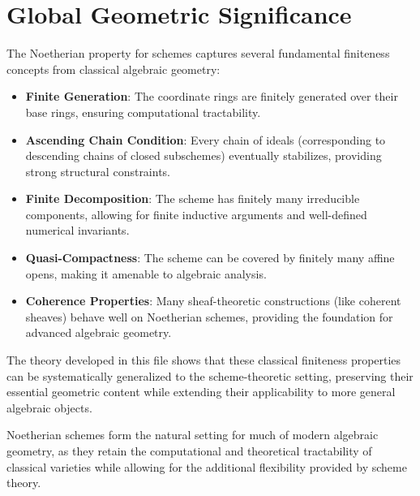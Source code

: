 \documentclass{article}
\theoremstyle{definition}
\begin{document}
\section{Global Geometric Significance}

The Noetherian property for schemes captures several fundamental finiteness concepts from classical algebraic geometry:

\begin{itemize}
\item \textbf{Finite Generation}: The coordinate rings are finitely generated over their base rings, ensuring computational tractability.

\item \textbf{Ascending Chain Condition}: Every chain of ideals (corresponding to descending chains of closed subschemes) eventually stabilizes, providing strong structural constraints.

\item \textbf{Finite Decomposition}: The scheme has finitely many irreducible components, allowing for finite inductive arguments and well-defined numerical invariants.

\item \textbf{Quasi-Compactness}: The scheme can be covered by finitely many affine opens, making it amenable to algebraic analysis.

\item \textbf{Coherence Properties}: Many sheaf-theoretic constructions (like coherent sheaves) behave well on Noetherian schemes, providing the foundation for advanced algebraic geometry.
\end{itemize}

The theory developed in this file shows that these classical finiteness properties can be systematically generalized to the scheme-theoretic setting, preserving their essential geometric content while extending their applicability to more general algebraic objects.

Noetherian schemes form the natural setting for much of modern algebraic geometry, as they retain the computational and theoretical tractability of classical varieties while allowing for the additional flexibility provided by scheme theory.
\end{document}
